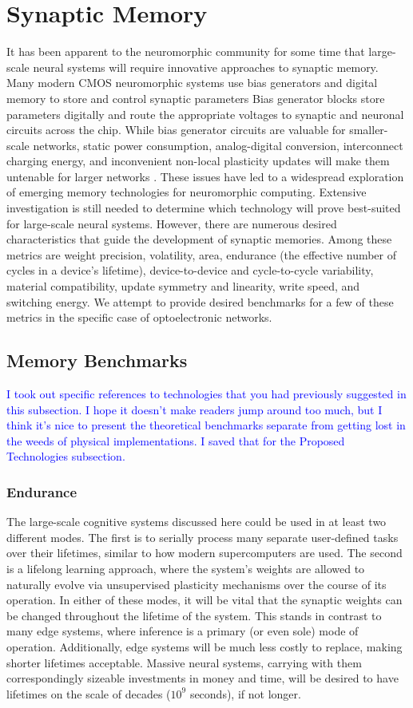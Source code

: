 \documentclass[twocolumn]{article}
\begin{document}
\section{\label{sec:memory}Synaptic Memory}
It has been apparent to the neuromorphic community for some time that large-scale neural systems will require innovative approaches to synaptic memory. Many modern CMOS neuromorphic systems use bias generators and digital memory to store and control synaptic parameters \cite{liu2014event} Bias generator blocks store parameters digitally and route the appropriate voltages to synaptic and neuronal circuits across the chip. While bias generator circuits are valuable for smaller-scale networks, static power consumption, analog-digital conversion, interconnect charging energy, and inconvenient non-local plasticity updates will make them untenable for larger networks \cite{dalgaty2019hybrid}. These issues have led to a widespread exploration of emerging memory technologies for neuromorphic computing. Extensive investigation is still needed to determine which technology will prove best-suited for large-scale neural systems. However, there are numerous desired characteristics that guide the development of synaptic memories. Among these metrics are weight precision, volatility, area, endurance (the effective number of cycles in a device's lifetime), device-to-device and cycle-to-cycle variability, material compatibility, update symmetry and linearity, write speed, and switching energy. We attempt to provide desired benchmarks for a few of these metrics in the specific case of optoelectronic networks.
\subsection{Memory Benchmarks}

\textcolor{blue}{I took out specific references to technologies that you had previously suggested in this subsection. I hope it doesn't make readers jump around too much, but I think it's nice to present the theoretical benchmarks separate from getting lost in the weeds of physical implementations. I saved that for the Proposed Technologies subsection.}
\subsubsection{Endurance}
The large-scale cognitive systems discussed here could be used in at least two different modes. The first is to serially process many separate user-defined tasks over their lifetimes, similar to how modern supercomputers are used. The second is a lifelong learning approach, where the system's weights are allowed to naturally evolve via unsupervised plasticity mechanisms over the course of its operation. In either of these modes, it will be vital that the synaptic weights can be changed throughout the lifetime of the system. This stands in contrast to many edge systems, where inference is a primary (or even sole) mode of operation. Additionally, edge systems will be much less costly to replace, making shorter lifetimes acceptable. Massive neural systems, carrying with them correspondingly sizeable investments in money and time, will be desired to have lifetimes on the scale of decades ($10^9$ seconds), if not longer.
\end{document}

